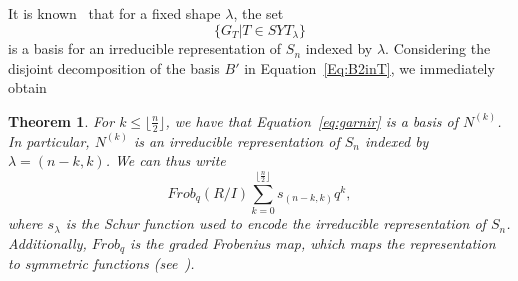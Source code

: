 \documentclass[10pt,a4paper]{article}
\newtheorem{theorem}{Theorem}[section]
\begin{document}
It is known~\cite{Sagan,Specht} that for a fixed shape $\lambda$, the set 
\begin{equation}\label{eq:garnir}
 \big\{G_T\big| T \in SYT_\lambda\big\}
 \end{equation}
  is a basis for an irreducible representation 
of $S_n$ indexed  by   $\lambda$. 
Considering the disjoint decomposition of the basis $B'$ in  Equation~\eqref{Eq:B2inT}, we immediately obtain
\begin{theorem}
    For $k\le \lfloor \frac{n}{2} \rfloor$, we have that Equation~\eqref{eq:garnir} is a basis of $N^{(k)}$. In particular, $N^{(k)}$ is an irreducible representation of $S_n$
    indexed by $\lambda=(n-k,k)$. We can thus write
    $$ Frob_q(R/I) \sum_{k=0}^{ \lfloor \frac{n}{2} \rfloor} s_{(n-k,k)} q^k,$$
    where $s_\lambda$  is the Schur function used to encode the irreducible representation of $S_n$. Additionally, $Frob_q$ is the graded Frobenius map, which maps the representation to symmetric functions (see~\cite{Sagan,Macdonald}).
\end{theorem}




\end{document}
